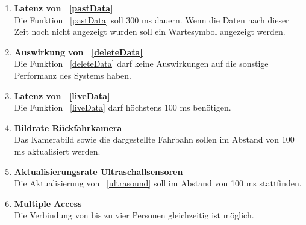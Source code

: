 \documentclass[pflichtenheft.tex]{subfiles}
\begin{document}
\begin{enumerate}

\item{\textbf{Latenz von ~\ref{pastData}}} \\
Die Funktion ~\ref{pastData} soll 300 ms dauern. Wenn die Daten nach dieser Zeit noch nicht angezeigt wurden soll ein Wartesymbol angezeigt werden. 

\item{\textbf{Auswirkung von ~\ref{deleteData}}} \\
Die Funktion ~\ref{deleteData} darf keine Auswirkungen auf die sonstige Performanz des Systems haben.

\item{\textbf{Latenz von ~\ref{liveData}}} \\
Die Funktion ~\ref{liveData} darf höchstens 100 ms benötigen.

\item{\textbf{Bildrate Rückfahrkamera}} \\
Das Kamerabild sowie die dargestellte Fahrbahn sollen im Abstand von 100 ms aktualisiert werden.

\item{\textbf{Aktualisierungsrate Ultraschallsensoren}} \\
Die Aktualisierung von ~\ref{ultrasound} soll im Abstand von 100 ms stattfinden.

\item{\textbf{Multiple Access}} \\
Die Verbindung von bis zu vier Personen gleichzeitig ist möglich.


\end{enumerate}
\end{document}
